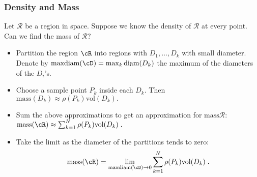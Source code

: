 \begin{frame}
\frametitle{Density and Mass}
\begin{question}
Let $\mathcal R$ be a region in space. Suppose we know the density of $\mathcal R$ at every point. Can we find the mass of $\mathcal R$?
\end{question}
\begin{itemize}
\item<2-> Partition the region $\cR$ into regions with $D_1,\dots, D_k$ with small diameter. Denote by $\text{maxdiam}(\cD) = \max_{k} \text{diam}(D_k)$ the maximum of the diameters of the $D_i$'s. 
\item<3-> Choose a sample point $P_k$ inside each $D_k$. Then 
$
\text{mass}(D_k) \approx \rho(P_k) \text{vol}(D_k) .
$
\item<4-> Sum the above approximations to get an approximation for  $\text{mass}\mathcal R$: $\text{mass}(\cR) \approx \sum_{k=1}^{N} \rho(P_k)\text{vol}(D_k)\; .$
\item<5-> Take the limit as the diameter of the partitions tends to zero:
$$\text{mass}(\cR) = \lim_{\text{maxdiam}(\cD) \to 0}  \sum_{k=1}^{N} \rho(P_k)\text{vol}(D_k)\; .$$
\end{itemize}
\end{frame}